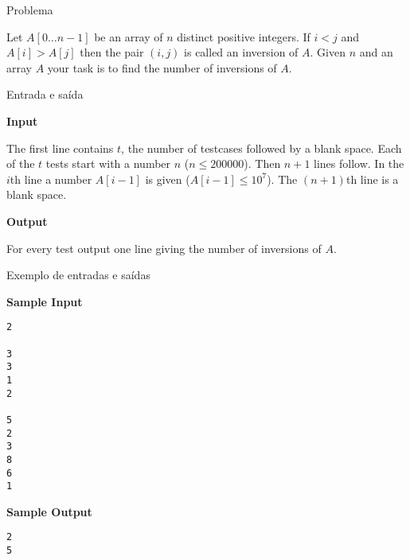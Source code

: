 
\begin{frame}[fragile]{Problema}

Let $A[0\ldots n-1]$ be an array of $n$ distinct positive integers. If 
$i < j$ and $A[i] > A[j]$ then the pair $(i, j)$ is called an inversion of $A$. Given 
$n$ and an array $A$ your task is to find the number of inversions of $A$.

\end{frame}

\begin{frame}[fragile]{Entrada e saída}

\textbf{Input}

The first line contains $t$, the number of testcases followed by a blank space. Each of the $t$ 
tests start with a number $n$ ($n \leq 200000$). Then $n + 1$ lines follow. In the $i$th line a 
number $A[i - 1]$ is given ($A[i - 1] \leq 10^7$). The $(n + 1)$th line is a blank space.

\vspace{0.3in}

\textbf{Output}

For every test output one line giving the number of inversions of $A$.

\end{frame}

\begin{frame}[fragile]{Exemplo de entradas e saídas}

\begin{minipage}[t]{0.5\textwidth}
\textbf{Sample Input}
\begin{verbatim}
2

3
3
1
2

5
2
3
8
6
1
\end{verbatim}
\end{minipage}
\begin{minipage}[t]{0.45\textwidth}
\textbf{Sample Output}
\begin{verbatim}
2
5
\end{verbatim}
\end{minipage}
\end{frame}

